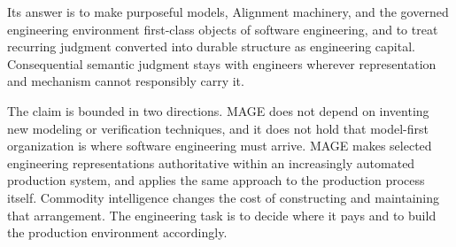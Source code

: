 Its answer is to make purposeful models, Alignment machinery, and the governed engineering environment first-class objects of software engineering, and to treat recurring judgment converted into durable structure as engineering capital. Consequential semantic judgment stays with engineers wherever representation and mechanism cannot responsibly carry it.

The claim is bounded in two directions. MAGE does not depend on inventing new modeling or verification techniques, and it does not hold that model-first organization is where software engineering must arrive. MAGE makes selected engineering representations authoritative within an increasingly automated production system, and applies the same approach to the production process itself. Commodity intelligence changes the cost of constructing and maintaining that arrangement. The engineering task is to decide where it pays and to build the production environment accordingly.
